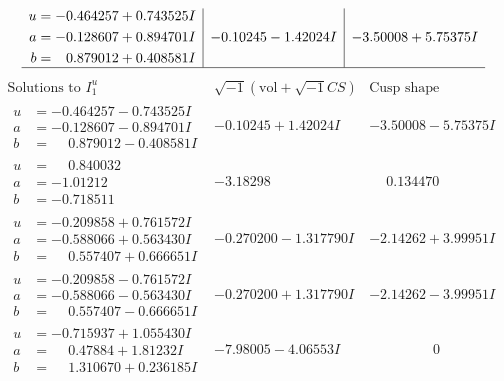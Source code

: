 \documentclass[1p]{elsarticle_modified}
\theoremstyle{definition}
\newcommand{\I}{\sqrt{-1}}
\begin{document}
$$\begin{array}{c|c|c}
\begin{aligned}
u &= -0.464257 + 0.743525 I \\
a &= -0.128607 + 0.894701 I \\
b &= \phantom{-}0.879012 + 0.408581 I\end{aligned}
 & -0.10245 - 1.42024 I & -3.50008 + 5.75375 I\\
 \hline 
 \end{array}$$\newpage$$\begin{array}{c|c|c}  
\text{Solutions to }I^u_{1}& \I (\text{vol} + \sqrt{-1}CS) & \text{Cusp shape}\\
 \hline 
\begin{aligned}
u &= -0.464257 - 0.743525 I \\
a &= -0.128607 - 0.894701 I \\
b &= \phantom{-}0.879012 - 0.408581 I\end{aligned}
 & -0.10245 + 1.42024 I & -3.50008 - 5.75375 I \\ \hline\begin{aligned}
u &= \phantom{-}0.840032\phantom{ +0.000000I} \\
a &= -1.01212\phantom{ +0.000000I} \\
b &= -0.718511\phantom{ +0.000000I}\end{aligned}
 & -3.18298\phantom{ +0.000000I} & \phantom{-}0.134470\phantom{ +0.000000I} \\ \hline\begin{aligned}
u &= -0.209858 + 0.761572 I \\
a &= -0.588066 + 0.563430 I \\
b &= \phantom{-}0.557407 + 0.666651 I\end{aligned}
 & -0.270200 - 1.317790 I & -2.14262 + 3.99951 I \\ \hline\begin{aligned}
u &= -0.209858 - 0.761572 I \\
a &= -0.588066 - 0.563430 I \\
b &= \phantom{-}0.557407 - 0.666651 I\end{aligned}
 & -0.270200 + 1.317790 I & -2.14262 - 3.99951 I \\ \hline\begin{aligned}
u &= -0.715937 + 1.055430 I \\
a &= \phantom{-}0.47884 + 1.81232 I \\
b &= \phantom{-}1.310670 + 0.236185 I\end{aligned}
 & -7.98005 - 4.06553 I & \phantom{-0.000000 } 0 \\ \hline\begin{aligned}

\end{aligned}
\end{array}$$
\end{document}
